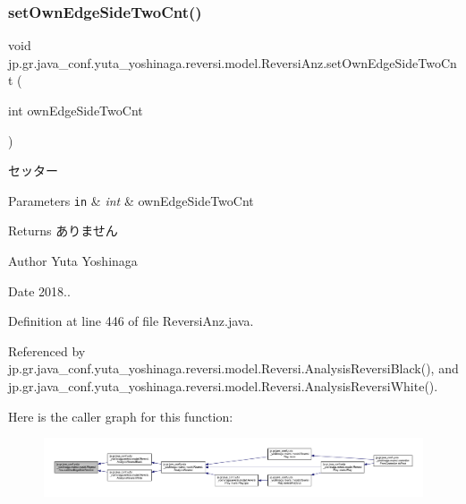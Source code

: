 \subsubsection{\texorpdfstring{set\+Own\+Edge\+Side\+Two\+Cnt()}{setOwnEdgeSideTwoCnt()}}
{\footnotesize\ttfamily void jp.\+gr.\+java\+\_\+conf.\+yuta\+\_\+yoshinaga.\+reversi.\+model.\+Reversi\+Anz.\+set\+Own\+Edge\+Side\+Two\+Cnt (\begin{DoxyParamCaption}\item[{int}]{own\+Edge\+Side\+Two\+Cnt }\end{DoxyParamCaption})}



セッター 


\begin{DoxyParams}[1]{Parameters}
\mbox{\tt in}  & {\em int} & own\+Edge\+Side\+Two\+Cnt \\
\hline
\end{DoxyParams}
\begin{DoxyReturn}{Returns}
ありません 
\end{DoxyReturn}
\begin{DoxyAuthor}{Author}
Yuta Yoshinaga 
\end{DoxyAuthor}
\begin{DoxyDate}{Date}
2018.. 
\end{DoxyDate}


Definition at line 446 of file Reversi\+Anz.\+java.



Referenced by jp.\+gr.\+java\+\_\+conf.\+yuta\+\_\+yoshinaga.\+reversi.\+model.\+Reversi.\+Analysis\+Reversi\+Black(), and jp.\+gr.\+java\+\_\+conf.\+yuta\+\_\+yoshinaga.\+reversi.\+model.\+Reversi.\+Analysis\+Reversi\+White().

Here is the caller graph for this function\+:
\nopagebreak
\begin{figure}[H]
\begin{center}
\leavevmode
\includegraphics[width=350pt]{classjp_1_1gr_1_1java__conf_1_1yuta__yoshinaga_1_1reversi_1_1model_1_1_reversi_anz_a2275456b67f846c90e37b8e726b46aa6_icgraph}
\end{center}
\end{figure}
\mbox{\label{classjp_1_1gr_1_1java__conf_1_1yuta__yoshinaga_1_1reversi_1_1model_1_1_reversi_anz_a081ca00af199ce00ac6970019471c472}} 
